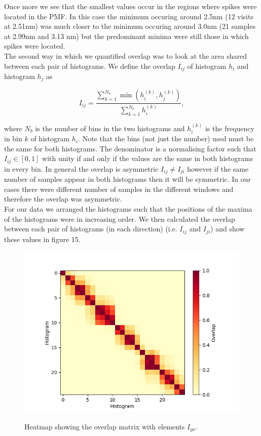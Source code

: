 \documentclass[12pt, onecolumn]{revtex4}    %
\begin{document}
Once more we see that the smallest values occur in the regions where spikes were located in the PMF.  In this case the minimum occuring around 2.5nm (12 visits at 2.51nm) was much closer to the minimum occuring around 3.0nm (21 samples at 2.99nm and 3.13 nm) but the predominant minima were still those in which spikes were located.\\

The second way in which we quantified overlap was to look at the area shared between each pair of histograms.  We define the overlap $I_{ij}$ of histogram $h_i$ and histogram $h_j$ as \cite{Over}

\begin{equation}
I_{ij} = \frac{\sum_{k = 1}^{N_b} \min(h_i^{(k)},  h_j^{(k)})}{\sum_{k = 1}^{N_b} h_i^{(k)}},
\end{equation}

where $N_b$ is the number of bins in the two histograms and $h_i^{(k)}$ is the frequency in bin $k$ of histogram $h_i$.  Note that the bins (not just the number) used must be the same for both histograms.  The denominator is a normalising factor such that $I_{ij} \in [0, 1]$ with unity if and only if the values are the same in both histograms in every bin.  In general the overlap is asymmetric $I_{ij} \neq I_{ji}$ however if the same number of samples appear in both histograms then it will be symmetric.  In our cases there were different number of samples in the different windows and therefore the overlap was asymmetric.\\

For our data we arranged the histograms such that the positions of the maxima of the histograms were in increasing order.  We then calculated the overlap between each pair of histograms (in each direction)  (i.e. $I_{ij}$ and $I_{ji}$) and show these values in figure 15.\\

\begin{figure}[h!]
\includegraphics[scale=0.5]{HelUMBOverOrd}
\label{fig: HelUmbOver}
\caption{Heatmap showing the overlap matrix with elements $I_{yx}$.}  
\end{figure}
\end{document}
